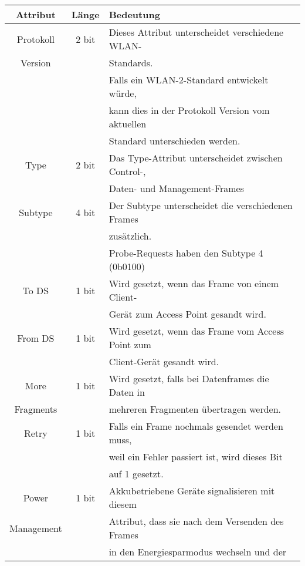 \begin{table}[h!]
	\centering
	\begin{tabular}{|c|c|l|}
		\hline
        \textbf{Attribut} & \textbf{Länge} & \textbf{Bedeutung} \\
        \hline
        Protokoll & 2 bit & 
        Dieses Attribut unterscheidet verschiedene WLAN- \\
        Version && Standards. \\
        && Falls ein WLAN-2-Standard entwickelt würde, \\
        && kann dies in der Protokoll Version vom aktuellen \\
        && Standard unterschieden werden. \\
        \hline
        Type & 2 bit & 
        Das Type-Attribut unterscheidet zwischen Control-, \\
        && Daten- und Management-Frames \\
        \hline
        Subtype & 4 bit & 
        Der Subtype unterscheidet die verschiedenen Frames \\
        && zusätzlich. \\
        && Probe-Requests haben den Subtype 4 (0b0100) \\
        \hline
        To DS & 1 bit & 
        Wird gesetzt, wenn das Frame von einem Client- \\
        && Gerät zum Access Point gesandt wird. \\
        \hline
        From DS & 1 bit &
        Wird gesetzt, wenn das Frame vom Access Point zum \\
        && Client-Gerät gesandt wird. \\
        \hline 
        More & 1 bit & 
        Wird gesetzt, falls bei Datenframes die Daten in \\
        Fragments && mehreren Fragmenten übertragen werden.\\
        \hline
        Retry & 1 bit & 
        Falls ein Frame nochmals gesendet werden muss,\\
        &&  weil ein Fehler passiert ist, wird dieses Bit\\
        &&  auf 1 gesetzt. \\
        \hline 
        Power & 1 bit & 
        Akkubetriebene Geräte signalisieren mit diesem  \\
        Management &&  
        Attribut, dass sie nach dem Versenden des Frames\\
        && in den Energiesparmodus  wechseln und der\\

\end{tabular}
\end{table}
